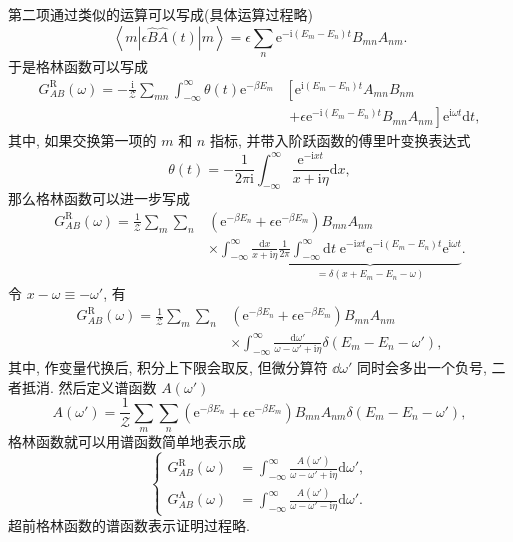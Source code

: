 第二项通过类似的运算可以写成(具体运算过程略)
\begin{equation}
    \left\langle m\left| \epsilon\hat{B}\hat{A}(t) \right|m \right\rangle=\epsilon\sum_n\mathrm{e}^{-\mathrm{i}(E_m-E_n)t}B_{mn}A_{nm}.
\end{equation}
于是格林函数可以写成
\begin{align}
    G_{AB}^{\mathrm{R}}(\omega)=-\frac{\mathrm{i}}{\mathcal{Z}}\sum_{mn}\int_{-\infty}^{\infty}\theta(t)\mathrm{e}^{-\beta E_m}&\left[ \mathrm{e}^{\mathrm{i}(E_m-E_n)t}A_{mn}B_{nm}\right.\nonumber\\
    &\;\left. +\epsilon\mathrm{e}^{-\mathrm{i}(E_m-E_n)t}B_{mn}A_{nm} \right] \mathrm{e}^{\mathrm{i}\omega t}\mathrm{d}t,
\end{align}
其中, 如果交换第一项的 $m$ 和 $n$ 指标, 并带入阶跃函数的傅里叶变换表达式
\begin{equation}
    \theta(t)=-\frac{1}{2\pi\mathrm{i}}\int_{-\infty}^\infty\frac{\mathrm{e}^{-\mathrm{i} xt}}{x+\mathrm{i}\eta}\mathrm{d}x,
\end{equation}
那么格林函数可以进一步写成
    \begin{align}
        G_{AB}^{\mathrm{R}}(\omega)=\frac{1}{\mathcal{Z}}\sum_m\sum_n&\left( \mathrm{e}^{-\beta E_n}+\epsilon\mathrm{e}^{-\beta E_m} \right) B_{mn}A_{nm}\nonumber\\
        &\times\int_{-\infty}^\infty \frac{\mathrm{d}x}{x+\mathrm{i}\eta}\underbrace{\frac{1}{2\pi}\int_{-\infty}^\infty \mathrm{d}t\; \mathrm{e}^{-\mathrm{i} xt}\mathrm{e}^{-\mathrm{i} (E_m-E_n)t}\mathrm{e}^{\mathrm{i}\omega t}}_{=\delta(x+E_m-E_n-\omega)}.
    \end{align}
令 $x-\omega\equiv -\omega'$, 有
\begin{align}
        G_{AB}^{\mathrm{R}}(\omega)=\frac{1}{\mathcal{Z}}\sum_m\sum_n&\left( \mathrm{e}^{-\beta E_n}+\epsilon\mathrm{e}^{-\beta E_m} \right) B_{mn}A_{nm}\nonumber\\
        &\times\int_{-\infty}^\infty \frac{\mathrm{d}\omega'}{\omega-\omega'+\mathrm{i}\eta}\delta(E_m-E_n-\omega'),
    \end{align}
其中, 作变量代换后, 积分上下限会取反, 但微分算符 $\dd \omega'$ 同时会多出一个负号, 二者抵消. 然后定义谱函数 $A(\omega')$
\begin{equation}
    A(\omega')=\frac{1}{\mathcal{Z}}\sum_m\sum_n\left( \mathrm{e}^{-\beta E_n}+\epsilon\mathrm{e}^{-\beta E_m} \right) B_{mn}A_{nm}\delta(E_m-E_n-\omega'),
\end{equation}
格林函数就可以用谱函数简单地表示成
\begin{equation}
\boxed{  \left\{  \begin{aligned}
    G_{AB}^{\mathrm{R}}(\omega)&=\int_{-\infty}^\infty\frac{A(\omega')}{\omega-\omega'+\mathrm{i}\eta}\mathrm{d}\omega',\\
    G_{AB}^{\mathrm{A}}(\omega)&=\int_{-\infty}^\infty\frac{A(\omega')}{\omega-\omega'-\mathrm{i}\eta}\mathrm{d}\omega'.
\end{aligned}\right. }
    \label{spectrum1}
\end{equation}
超前格林函数的谱函数表示证明过程略.
